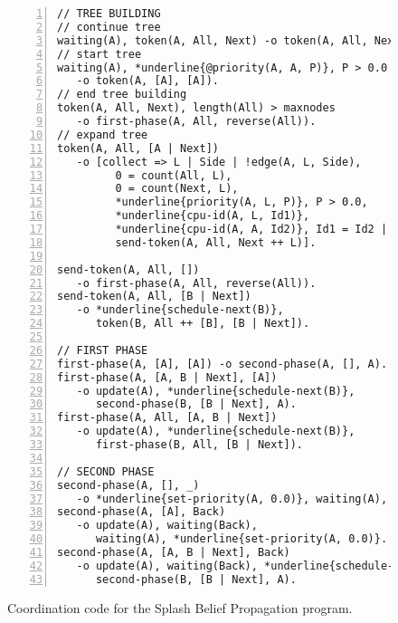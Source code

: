 \begin{figure}[h!]
\small\begin{Verbatim}[numbers=left,commandchars=*\{\}]
// TREE BUILDING
// continue tree
waiting(A), token(A, All, Next) -o token(A, All, Next).
// start tree
waiting(A), *underline{@priority(A, A, P)}, P > 0.0
   -o token(A, [A], [A]).
// end tree building
token(A, All, Next), length(All) > maxnodes
   -o first-phase(A, All, reverse(All)).
// expand tree
token(A, All, [A | Next])
   -o [collect => L | Side | !edge(A, L, Side),
         0 = count(All, L),
         0 = count(Next, L),
         *underline{priority(A, L, P)}, P > 0.0,
         *underline{cpu-id(A, L, Id1)},
         *underline{cpu-id(A, A, Id2)}, Id1 = Id2 |
         send-token(A, All, Next ++ L)].

send-token(A, All, [])
   -o first-phase(A, All, reverse(All)).
send-token(A, All, [B | Next])
   -o *underline{schedule-next(B)},
      token(B, All ++ [B], [B | Next]).

// FIRST PHASE
first-phase(A, [A], [A]) -o second-phase(A, [], A).
first-phase(A, [A, B | Next], [A])
   -o update(A), *underline{schedule-next(B)},
      second-phase(B, [B | Next], A).
first-phase(A, All, [A, B | Next])
   -o update(A), *underline{schedule-next(B)},
      first-phase(B, All, [B | Next]).

// SECOND PHASE
second-phase(A, [], _)
   -o *underline{set-priority(A, 0.0)}, waiting(A), update(A).
second-phase(A, [A], Back)
   -o update(A), waiting(Back),
      waiting(A), *underline{set-priority(A, 0.0)}.
second-phase(A, [A, B | Next], Back)
   -o update(A), waiting(Back), *underline{schedule-next(B)},
      second-phase(B, [B | Next], A).
\end{Verbatim}
  \caption{Coordination code for the Splash Belief Propagation program.}
  \label{code:sbp}
\end{figure}
\normalsize
